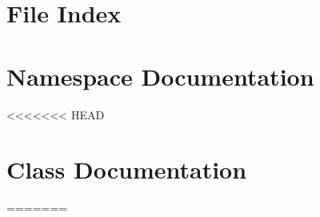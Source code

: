 \documentclass[twoside]{book}
\newcommand{\+}{\discretionary{\mbox{\scriptsize$\hookleftarrow$}}{}{}}
\begin{document}
\chapter{File Index}

\chapter{Namespace Documentation}



<<<<<<< HEAD


\chapter{Class Documentation}





=======
\end{document}
